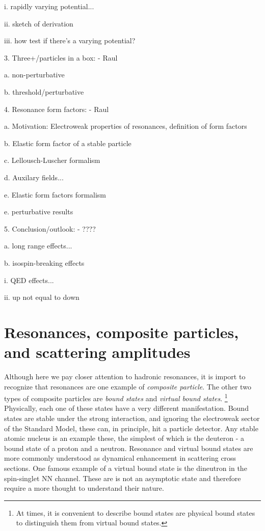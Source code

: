 \documentclass{iopart}
\theoremstyle{definition}
\begin{document}
{		i. rapidly varying potential...
	
		ii. sketch of derivation
	
		iii. how test if there's a varying potential?
	
3. Three+/particles in a box: - Raul
	
	a. non-perturbative
	
	b. threshold/perturbative


4. Resonance form factors: - Raul
	
	a. Motivation: Electroweak properties of resonances, definition of form factors
	
	b. Elastic form factor of a stable particle
	
	c. Lellousch-Luscher formalism

	d. Auxilary fields...
	
	e. Elastic form factors formalism
	
	e. perturbative results 


5. Conclusion/outlook: - ????

	a. long range effects...

	b. isospin-breaking effects
		
		i. QED effects...

		ii. up not equal to down
		
\section{Resonances, composite particles, and scattering amplitudes  \label{Sec:resonances}}

Although here we pay closer attention to hadronic resonances, it is import to recognize that resonances are one example of \emph{composite particle}. The other two types of composite particles are \emph{bound states} and \emph{virtual bound states}. 
\footnote{At times, it is convenient to describe bound states are physical bound states to distinguish them from virtual bound states.}
 Physically, each one of these states have a very different manifestation. Bound states are stable under the strong interaction, and ignoring the electroweak sector of the Standard Model, these can, in principle, hit a particle detector. Any stable atomic nucleus is an example these, the simplest of which is the deuteron - a bound state of a proton and a neutron. Resonance and virtual bound states are more commonly understood as dynamical enhancement in scattering cross sections. One famous example of a virtual bound state is the dineutron in the spin-singlet NN channel. These are is not an asymptotic state and therefore require a more thought to understand their nature.

}
\end{document}

